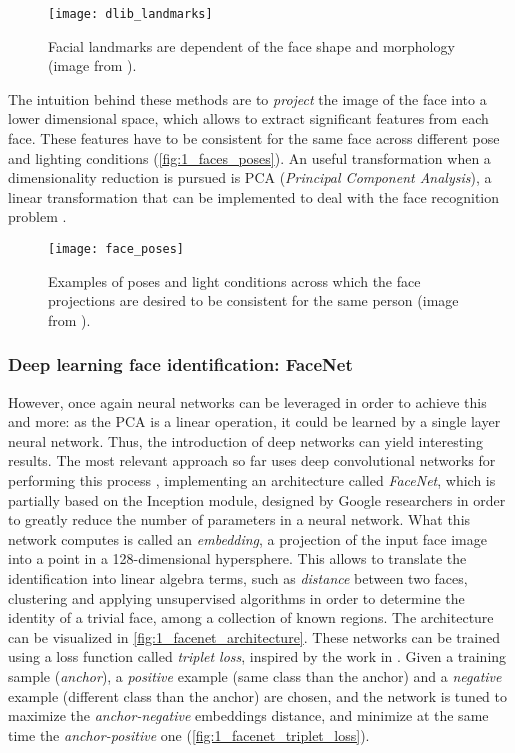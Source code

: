\begin{figure}[h]
	\centering
	\texttt{[image: dlib\_landmarks]}
	\caption{Facial landmarks are dependent of the face shape and morphology (image from \cite{dlib_review}).}
	\label{fig:1_dlib_landmarks}
\end{figure}


The intuition behind these methods are to \textit{project} the image of the face into a lower dimensional space, which allows to extract significant features from each face. These features have to be consistent for the same face across different pose and lighting conditions (\autoref{fig:1_faces_poses}). An useful transformation when a dimensionality reduction is pursued is PCA (\textit{Principal Component Analysis}), a linear transformation that can be implemented to deal with the face recognition problem \cite{face_pca}.

\begin{figure}[h]
	\centering
	\texttt{[image: face\_poses]}
	\caption{Examples of poses and light conditions across which the face projections are desired to be consistent for the same person (image from \cite{facenet}).}
	\label{fig:1_faces_poses}
\end{figure}

\subsubsection{Deep learning face identification: FaceNet}

However, once again neural networks can be leveraged in order to achieve this and more: as the PCA is a linear operation, it could be learned by a single layer neural network. Thus, the introduction of deep networks can yield interesting results. The most relevant approach so far uses deep convolutional networks for performing this process \cite{facenet}, implementing an architecture called \textit{FaceNet}, which is partially based on the Inception \cite{inception} module, designed by Google researchers in order to greatly reduce the number of parameters in a neural network. What this network computes is called an \textit{embedding}, a projection of the input face image into a point in a 128-dimensional hypersphere. This allows to translate the identification into linear algebra terms, such as \textit{distance} between two faces, clustering and applying unsupervised algorithms in order to determine the identity of a trivial face, among a collection of known regions. The architecture can be visualized in \autoref{fig:1_facenet_architecture}. These networks can be trained using a loss function called \textit{triplet loss}, inspired by the work in \cite{lmnn_loss}. Given a training sample (\textit{anchor}), a \textit{positive} example (same class than the anchor) and a \textit{negative} example (different class than the anchor) are chosen, and the network is tuned to maximize the \textit{anchor-negative} embeddings distance, and minimize at the same time the \textit{anchor-positive} one (\autoref{fig:1_facenet_triplet_loss}).


